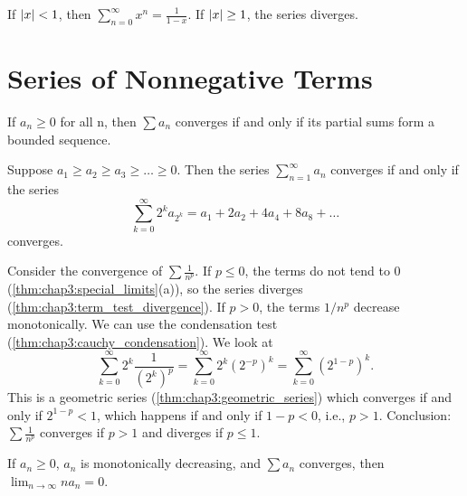 \begin{theorem} %
  \label{thm:chap3:geometric_series}
  If $\left\lvert x \right\rvert < 1$, then $\sum_{n=0}^\infty x^n = \frac{1}{1-x}$. If
  $\left\lvert x \right\rvert \ge 1$, the series diverges.
\end{theorem}



\section{Series of Nonnegative Terms}
\label{sec:chap3:nonneg_series}

\begin{theorem} %
  \label{thm:chap3:nonneg_conv_bounded_sums}
  If $a_n \ge 0$ for all n, then $\sum a_n$ converges if and only if
  its partial sums form a bounded sequence.
\end{theorem}

\begin{theorem} %
  \label{thm:chap3:cauchy_condensation}
  Suppose $a_1 \ge a_2 \ge a_3 \ge \dots \ge 0$. Then the series
  $\sum_{n=1}^\infty a_n$ converges if and only if the series
  \[ \sum_{k=0}^\infty 2^k a_{2^k} = a_1 + 2a_2 + 4a_4 + 8a_8 + \dots \]
  converges.
\end{theorem}

\begin{example}[p-series] %
  \label{ex:chap3:p_series}
  Consider the convergence of $\sum \frac{1}{n^p}$.
  If $p \le 0$, the terms do not tend to 0
  (\autoref{thm:chap3:special_limits}(a)), so the series diverges
  (\autoref{thm:chap3:term_test_divergence}).
  If $p > 0$, the terms $1/n^p$ decrease monotonically. We can use
  the condensation test (\autoref{thm:chap3:cauchy_condensation}). We look at
  \[ \sum_{k=0}^\infty 2^k \frac{1}{(2^k)^p} = \sum_{k=0}^\infty 2^k
  (2^{-p})^k = \sum_{k=0}^\infty (2^{1-p})^k. \]
  This is a geometric series (\autoref{thm:chap3:geometric_series})
  which converges if and only if $2^{1-p} < 1$, which happens if and
  only if $1-p < 0$, i.e., $p>1$.
  Conclusion: $\sum \frac{1}{n^p}$ converges if $p>1$ and diverges if $p \le 1$.
\end{example}

\begin{theorem} %
  \label{thm:chap3:condensation_general}
  If $a_n \ge 0$, $a_n$ is monotonically decreasing, and $\sum a_n$
  converges, then $\lim_{n \to \infty} n a_n = 0$.
\end{theorem}

